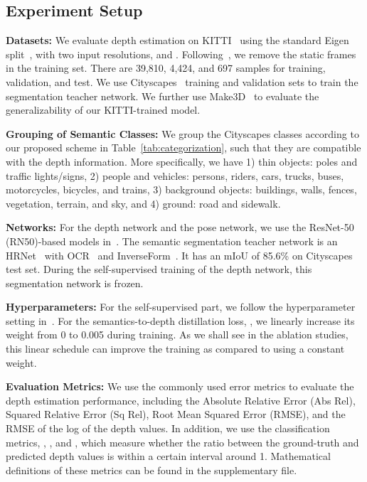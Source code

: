 \documentclass{bmvc2k}
\begin{document}
\vspace{-10pt}
\subsection{Experiment Setup}
\vspace{-5pt}
\noindent \textbf{Datasets:} We evaluate depth estimation on KITTI~\cite{geiger2013vision} using the standard Eigen split~\cite{eigen2015predicting}, with two input resolutions,  and . Following~\cite{zhou2017unsupervised}, we remove the static frames in the training set. There are 39,810, 4,424, and 697 samples for training, validation, and test.
We use Cityscapes~\cite{cordts2016cityscapes} training and validation sets to train the segmentation teacher network. We further use Make3D~\cite{saxena2005learning, saxena2008make3d} to evaluate the generalizability of our KITTI-trained model.

\noindent \textbf{Grouping of Semantic Classes:} We group the Cityscapes classes according to our proposed scheme in Table~\ref{tab:categorization}, such that they are compatible with the depth information. More specifically, we have 1) thin objects: poles and traffic lights/signs, 2) people and vehicles: persons, riders, cars, trucks, buses, motorcycles, bicycles, and trains, 3) background objects: buildings, walls, fences, vegetation, terrain, and sky, and 4) ground: road and sidewalk. 

\noindent \textbf{Networks:} For the depth network and the pose network, we use the ResNet-50 (RN50)-based models in~\cite{godard2019digging}. The semantic segmentation teacher network is an HRNet~\cite{wang2020deep} with OCR~\cite{yuan2020object} and InverseForm~\cite{borse2021inverseform}. It has an mIoU of 85.6\% on Cityscapes test set. During the self-supervised training of the depth network, this segmentation network is frozen.

\noindent \textbf{Hyperparameters:} For the self-supervised part, we follow the hyperparameter setting in~\cite{godard2019digging}. For the semantics-to-depth distillation loss, , we linearly increase its weight from 0 to 0.005 during training. As we shall see in the ablation studies, this linear schedule can improve the training as compared to using a constant weight.

\noindent \textbf{Evaluation Metrics:} We use the commonly used error metrics to evaluate the depth estimation performance, including the Absolute Relative Error (Abs Rel), Squared Relative Error (Sq Rel), Root Mean Squared Error (RMSE), and the RMSE of the log of the depth values. In addition, we use the classification metrics, , , and , which measure whether the ratio between the ground-truth and predicted depth values is within a certain interval around 1. Mathematical definitions of these metrics can be found in the supplementary file. 
\end{document}
